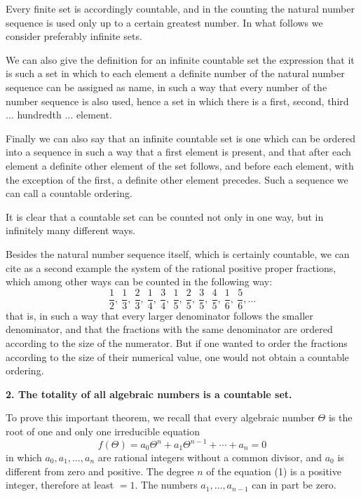 \documentclass[11pt]{article}
\begin{document}
Every finite set is accordingly countable, and in the counting the natural number sequence is used only up to a certain greatest number. In what follows we consider preferably infinite sets.

We can also give the definition for an infinite countable set the expression that it is such a set in which to each element a definite number of the natural number sequence can be assigned as name, in such a way that every number of the number sequence is also used, hence a set in which there is a first, second, third $\ldots$ hundredth $\ldots$ element.

Finally we can also say that an infinite countable set is one which can be ordered into a sequence in such a way that a first element is present, and that after each element a definite other element of the set follows, and before each element, with the exception of the first, a definite other element precedes. Such a sequence we can call a countable ordering.

It is clear that a countable set can be counted not only in one way, but in infinitely many different ways.

Besides the natural number sequence itself, which is certainly countable, we can cite as a second example the system of the rational positive proper fractions, which among other ways can be counted in the following way:
\[
\frac12,\ \frac13,\ \frac23,\ \frac14,\ \frac34,\ \frac15,\ \frac25,\ \frac35,\ \frac45,\ \frac16,\ \frac56,\ldots
\]
that is, in such a way that every larger denominator follows the smaller denominator, and that the fractions with the same denominator are ordered according to the size of the numerator. But if one wanted to order the fractions according to the size of their numerical value, one would not obtain a countable ordering.

\textbf{2. The totality of all algebraic numbers is a countable set.}

To prove this important theorem, we recall that every algebraic number $\Theta$ is the root of one and only one irreducible equation
\begin{equation}\tag{1}
f(\Theta)=a_0\Theta^n+a_1\Theta^{n-1}+\cdots+a_n=0
\end{equation}
in which $a_0,a_1,\ldots,a_n$ are rational integers without a common divisor, and $a_0$ is different from zero and positive. The degree $n$ of the equation (1) is a positive integer, therefore at least $=1$. The numbers $a_1,\ldots,a_{n-1}$ can in part be zero.
\end{document}
